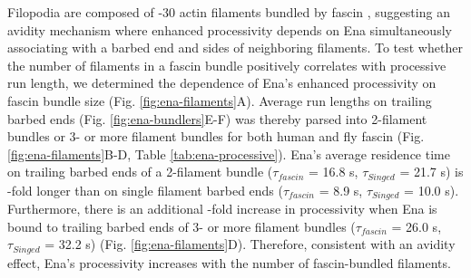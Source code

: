 Filopodia are composed of -30 actin filaments bundled by fascin \citep{svitkina_mechanism_2003,faix_making_2006}, suggesting an avidity mechanism where enhanced processivity depends on Ena simultaneously associating with a barbed end and sides of neighboring filaments. To test whether the number of filaments in a fascin bundle positively correlates with processive run length, we determined the dependence of Ena's enhanced processivity on fascin bundle size (Fig. \ref{fig:ena-filaments}A). Average run lengths on trailing barbed ends (Fig. \ref{fig:ena-bundlers}E-F) was thereby parsed into 2-filament bundles or 3- or more filament bundles for both human and fly fascin (Fig. \ref{fig:ena-filaments}B-D, Table \ref{tab:ena-processive}). Ena's average residence time on trailing barbed ends of a 2-filament bundle ($\tau_{fascin}$ = 16.8 s, $\tau_{Singed}$ = 21.7 s) is -fold longer than on single filament barbed ends ($\tau_{fascin}$ = 8.9 s, $\tau_{Singed}$ = 10.0 s). Furthermore, there is an additional -fold increase in processivity when Ena is bound to trailing barbed ends of 3- or more filament bundles ($\tau_{fascin}$ = 26.0 s, $\tau_{Singed}$ = 32.2 s) (Fig. \ref{fig:ena-filaments}D). Therefore, consistent with an avidity effect, Ena's processivity increases with the number of fascin-bundled filaments. 

